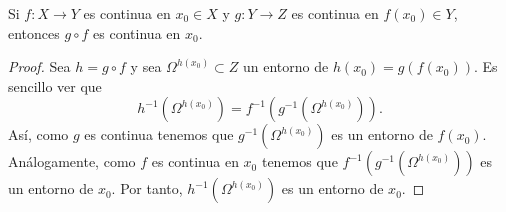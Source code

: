 \begin{prop}
Si $\displaystyle f : X \to Y $ es continua en $\displaystyle x_{0} \in X $ y $\displaystyle g : Y \to Z $ es continua en $\displaystyle f\left(x_{0}\right)\in Y $, entonces $\displaystyle g\circ f $ es continua en $\displaystyle x_{0} $.
\end{prop}
\begin{proof}
	Sea $\displaystyle h = g\circ f $ y sea $\displaystyle \Omega^{h\left(x_{0}\right)} \subset Z$ un entorno de $\displaystyle h\left(x_{0}\right)=g\left(f\left(x_{0}\right)\right) $. Es sencillo ver que 
	\[h^{-1}\left(\Omega^{h\left(x_{0}\right)}\right)=f^{-1}\left(g^{-1}\left(\Omega^{h\left(x_{0}\right)}\right)\right) .\]
Así, como $\displaystyle g $ es continua tenemos que $\displaystyle g^{-1}\left(\Omega^{h\left(x_{0}\right)}\right) $ es un entorno de $\displaystyle f\left(x_{0}\right) $. Análogamente, como $\displaystyle f $ es continua en $\displaystyle x_{0} $ tenemos que $\displaystyle f^{-1}\left(g^{-1}\left(\Omega^{h\left(x_{0}\right)}\right)\right) $ es un entorno de $\displaystyle x_{0} $. Por tanto, $\displaystyle h^{-1}\left(\Omega^{h\left(x_{0}\right)}\right) $ es un entorno de $\displaystyle x_{0} $. 
\end{proof}
